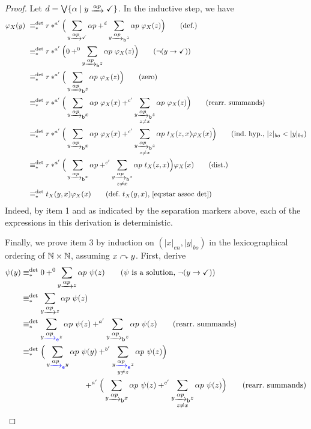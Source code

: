 \documentclass[orivec,envcountsect,envcountsame]{llncs}
\begin{document}
\begin{proof}
	Let \(d = \bigvee \{\alpha \mid y \tr{\alpha  p} \checkmark\}\).
	In the inductive step, we have
	\begin{align*}
		\varphi_X(y) \
		&\equiv_*^{\det} r*^{a'} \Big(\sum_{y \tr{\alpha  p} \checkmark} \alpha p +^{d} \sum_{y \btr{\alpha  p} z} \alpha p~\varphi_X(z) \Big)
		\tag{def.}\\
		&\equiv_*^{\det} r*^{a'} \Big(0 +^{0} \sum_{y \btr{\alpha  p} z} \alpha p~\varphi_X(z) \Big)
		\tag{\(\neg(y \to \checkmark)\)}\\
		&\equiv_*^{\det} r*^{a'} \Big(\sum_{y \btr{\alpha  p} z} \alpha p~\varphi_X(z) \Big)
		\tag{zero} \\
		&\equiv_*^{\det} r*^{a'} \Big(\sum_{y \btr{\alpha  p} x} \alpha p~\varphi_X(x) +^{c'} \sum_{\substack{y \btr{\alpha  p} z\\z \neq x}} \alpha p~\varphi_X(z) \Big)
		\tag{rearr.~summands} \\
		&\equiv_*^{\det} r*^{a'} \Big(\sum_{y \btr{\alpha  p} x} \alpha p~\varphi_X(x) +^{c'} \sum_{\substack{y \btr{\alpha  p} z\\z \neq x}} \alpha p~t_X(z,x)\varphi_X(x) \Big)
		\tag{ind.~hyp., \(|z|_{bo} < |y|_{bo}\)}\\
		&\equiv_*^{\det} r*^{a'} \Big(\sum_{y \btr{\alpha  p} x} \alpha p +^{c'} \sum_{\substack{y \btr{\alpha  p} z\\z \neq x}} \alpha p~t_X(z,x) \Big)\varphi_X(x)
		\tag{dist.} \\
		&\equiv_*^{\det} t_X(y,x)\varphi_X(x) \tag{def.~\(t_X(y,x)\), \eqref{eq:star assoc det}} %
	\end{align*}
	Indeed, by item 1 and as indicated by the separation markers above, each of the expressions in this derivation is deterministic.

	Finally, we prove item 3 by induction on \((|x|_{en},|y|_{bo})\) in the lexicographical ordering of \(\mathbb{N}\times\mathbb{N}\), assuming \(x \mathrel{\curvearrowright} y\).
	First, derive
	\begin{align*}
		\psi(y)
		&\equiv_*^{\det} 0 +^0 \sum_{y \tr{\alpha p} z} \alpha p ~\psi(z) \tag{$\psi$ is a solution, \(\neg(y \to \checkmark)\)} \\
	    & \equiv_*^{\det} \sum_{y \tr{\alpha p} z} \alpha p ~\psi(z) \\
		&\equiv_*^{\det} \sum_{y \etr{\alpha p} z} \alpha p ~\psi(z) +^{a'} \sum_{y \btr{\alpha p} z} \alpha p ~\psi(z)
		\tag{rearr.~summands} \\
		&\equiv_*^{\det} \Big(\sum_{y \etr{\alpha p} y} \alpha p ~\psi(y) +^{b'} \sum_{\substack{y \etr{\alpha p} z\\y \neq z}} \alpha p ~\psi(z)\Big) \\ & \hspace{8em}+^{a'} \Big(
			\sum_{y \btr{\alpha p} x} \alpha p ~\psi(z)
			+^{c'} \sum_{\substack{y \btr{\alpha p} z\\z \neq x}} \alpha p ~\psi(z)
		\Big)
		\tag{rearr.~summands}
	\end{align*}


\end{proof}
\end{document}
